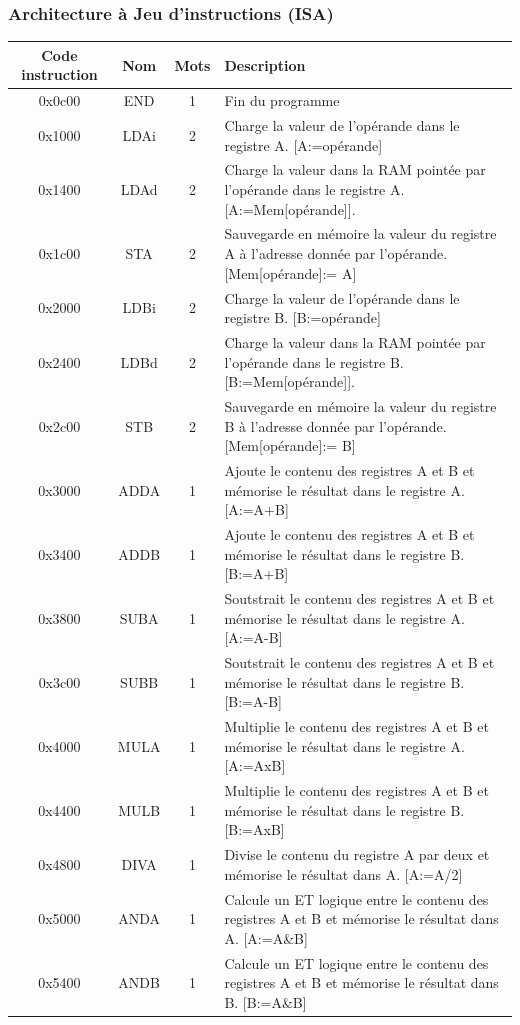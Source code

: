 \documentclass{beamer}
\begin{document}
\begin{frame}
\frametitle{Architecture à Jeu d'instructions (ISA)}
\begin{tiny}
\begin{tabular}{cccp{10cm}}
Code instruction & Nom & Mots & Description \\
\hline
0x0c00 & END & 1 & Fin du programme\\
0x1000 & LDAi & 2 & Charge la valeur de l'opérande dans le registre A. [A:=opérande]\\
0x1400 & LDAd & 2 & Charge la valeur dans la RAM pointée par l'opérande dans le registre A. [A:=Mem[opérande]].\\
0x1c00 & STA & 2 & Sauvegarde en mémoire la valeur du registre A à l'adresse donnée par l'opérande. [Mem[opérande]:= A]\\
0x2000 & LDBi & 2 & Charge la valeur de l'opérande dans le registre B. [B:=opérande]\\
0x2400 & LDBd & 2 & Charge la valeur dans la RAM pointée par l'opérande dans le registre B. [B:=Mem[opérande]].\\
0x2c00 & STB & 2 & Sauvegarde en mémoire la valeur du registre B à l'adresse donnée par l'opérande. [Mem[opérande]:= B]\\
0x3000 & ADDA &	1 &Ajoute le contenu des registres A et B et mémorise le résultat dans le registre A. [A:=A+B]\\
0x3400 & ADDB &1 &Ajoute le contenu des registres A et B et mémorise le résultat dans le registre B. [B:=A+B]\\
0x3800 & SUBA & 1 &Soutstrait le contenu des registres A et B et mémorise le résultat dans le registre A. [A:=A-B]\\
0x3c00&	SUBB &1 &Soutstrait le contenu des registres A et B et mémorise le résultat dans le registre B. [B:=A-B]\\
0x4000& MULA &1 &Multiplie le contenu des registres A et B et mémorise le résultat dans le registre A. [A:=AxB] \\
0x4400&	MULB &1 &Multiplie le contenu des registres A et B et mémorise le résultat dans le registre B. [B:=AxB]\\
0x4800& DIVA &1 &Divise le contenu du registre A par deux et mémorise le résultat dans A. [A:=A/2]\\
0x5000&	ANDA &1 & Calcule un ET logique entre le contenu des registres A et B et mémorise le résultat dans A. [A:=A\&B]\\
0x5400&	ANDB &1 & Calcule un ET logique entre le contenu des registres A et B et mémorise le résultat dans B. [B:=A\&B]\\

\end{tabular}
\end{tiny}
\end{frame}
\end{document}
